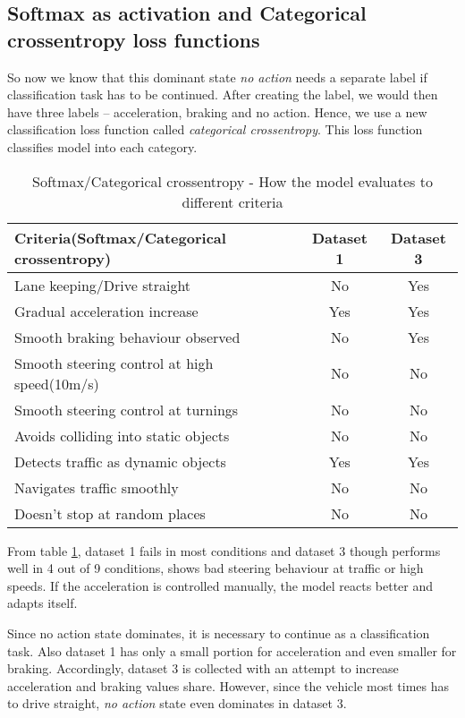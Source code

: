 \subsection{Softmax as activation and Categorical crossentropy loss functions}
So now we know that this dominant state \textit{no action} needs a separate label if
classification task has to be continued. After creating the label, we would then have
three labels -- acceleration, braking and no action. Hence, we use a new classification
loss function called \textit{categorical crossentropy}. This loss function classifies
model into each category.

\begin{table}[h]
    \centering
\begin{tabular}{lcc}
    \toprule
    Criteria(Softmax/Categorical crossentropy) & Dataset 1 & Dataset 3 \\\midrule
    Lane keeping/Drive straight  & No & Yes  \\
    Gradual acceleration increase & Yes & Yes\\
    Smooth braking behaviour observed & No & Yes \\
    Smooth steering control at high speed(10m/s) & No & No \\
    Smooth steering control at turnings & No & No\\
    Avoids colliding into static objects & No & No \\
    Detects traffic as dynamic objects & Yes & Yes\\
    Navigates traffic smoothly & No & No\\
    Doesn't stop at random places & No & No \\\bottomrule
\end{tabular}
\caption{Softmax/Categorical crossentropy - How the model evaluates to different criteria}
\label{table:softmaxandcce}
\end{table}

From table \ref{table:softmaxandcce}, dataset 1 fails in most conditions and dataset 3
though performs well in 4 out of 9 conditions, shows bad steering behaviour at traffic or high
speeds. If the acceleration is controlled manually, the model reacts better and adapts
itself.

Since no action state dominates, it is necessary to continue as a classification task.
Also dataset 1 has only a small portion for acceleration and even smaller for
braking. Accordingly, dataset 3 is collected with an attempt to increase acceleration
and braking values share. However, since the vehicle most times has to drive straight, \textit{no action} state even dominates in dataset 3.

